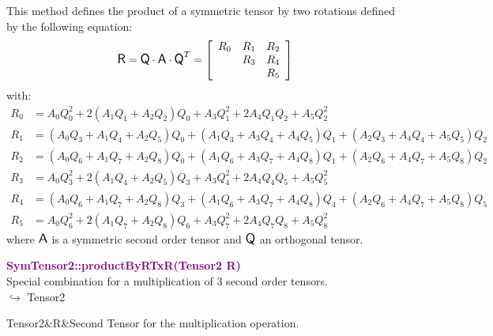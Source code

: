 This method defines the product of a symmetric tensor by two rotations defined by the following equation:
\begin{equation*}
\mbox{\large\ensuremath{\mathsf{R}}} = \mbox{\large\ensuremath{\mathsf{Q}}} \cdot \mbox{\large\ensuremath{\mathsf{A}}} \cdot \mbox{\large\ensuremath{\mathsf{Q}}}^T =\left[\begin{array}{ccc}
R_0&R_1&R_2\\
&R_3&R_4\\
&&R_5
\end{array}\right]
\end{equation*}
with:
\begin{align*}
R_0&=A_0 Q_0^2 + 2 (A_1 Q_1 + A_2 Q_2)Q_0 + A_3 Q_1^2 + 2 A_4 Q_1 Q_2 + A_5 Q_2^2\\
R_1&=(A_0 Q_3 + A_1 Q_4 + A_2 Q_5)Q_0 + (A_1 Q_3 + A_3 Q_4 + A_4 Q_5)Q_1 + (A_2 Q_3 + A_4 Q_4 + A_5 Q_5)Q_2\\
R_2&= (A_0 Q_6 + A_1 Q_7 + A_2 Q_8)Q_0 + (A_1 Q_6 + A_3 Q_7 + A_4 Q_8)Q_1 + (A_2 Q_6 + A_4 Q_7 + A_5 Q_8)Q_2\\
R_3&=A_0 Q_3^2 + 2 (A_1 Q_4 + A_2 Q_5)Q_3+ A_3 Q_4^2 + 2 A_4 Q_4 Q_5 + A_5 Q_5^2\\
R_4&= (A_0 Q_6 + A_1 Q_7 + A_2 Q_8)Q_3 + (A_1 Q_6 + A_3 Q_7 + A_4 Q_8)Q_4 + (A_2 Q_6 + A_4 Q_7 + A_5 Q_8)Q_5\\
R_5&=A_0 Q_6^2 + 2 (A_1 Q_7 + A_2 Q_8)Q_6+ A_3 Q_7^2 + 2 A_4 Q_7 Q_8 + A_5 Q_8^2
\end{align*}
where $\mbox{\large\ensuremath{\mathsf{A}}}$ is a symmetric second order tensor and $\mbox{\large\ensuremath{\mathsf{Q}}}$ an orthogonal tensor.

\textcolor{purple}{\textbf{SymTensor2::productByRTxR(Tensor2 R)}}\label{SymTensor2::productByRTxR(Tensor2 R)}\\
Special combination for a multiplication of 3 second order tensors.\\ \hspace*{10mm}$\hookrightarrow$ Tensor2

\begin{tcolorbox}[width=\textwidth,myArgs,tabularx={ll|R},title=Arguments of SymTensor2::productByRTxR]
Tensor2&R&Second Tensor for the multiplication operation.
\end{tcolorbox}

